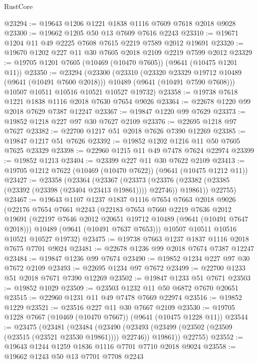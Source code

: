 \begin{lexlean}{RustCore}
\begin{coremodule}
@23294 := @19643 @1206 @1221 @1838 @1116 @7609 @7618 @2018 @9028
@23300 := @19662 @1205 @50 @13 @7609 @7616 @2243
@23310 := @19671 @1204 @11 @49 @2225 @7608 @7615 @2219 @7589 @2012 @19691
@23320 := @19670 @1202 @227 @11 @30 @7605 @2018 @2109 @2219 @7599 @2012
@23329 := @19705 @1201 @7605 (@10469 (@10470 @7605)) (@9641 (@10475 @1201 @11))
@23350 := @23294
    (@23300
      (@23310
        (@23320 @23329 @19712 @10489 (@9641 (@10491 @7600 @2018)))
        @10489
        (@9641 (@10491 @7590 @7608)))
      @10507
      @10511
      @10516
      @10521
      @10527
      @19732)
@23358 := @19738 @7618 @1221 @1838 @1116 @2018 @7630 @7654 @9026
@23364 := @22678 @1220 @99 @2018 @7629 @7387 @12247
@23367 := @19847 @1220 @99 @7629
@23373 := @19852 @1218 @227 @97 @30 @7627 @2109
@23376 := @22695 @1218 @97 @7627
@23382 := @22700 @1217 @51 @2018 @7626 @7390 @12269
@23385 := @19847 @1217 @51 @7626
@23392 := @19852 @1202 @1216 @11 @50 @7605 @7625 @23329
@23398 := @22960 @1215 @11 @49 @7478 @7624 @22974
@23399 := @19852 @1213
@23404 := @23399 @227 @11 @30 @7622 @2109
@23413 := @19705 @1212 @7622 (@10469 (@10470 @7622)) (@9641 (@10475 @1212 @11))
@23427 := @23358
    (@23364
      (@23367
        (@23373 (@23376 (@23382 (@23385 (@23392 (@23398 (@23404 @23413 @19861)))) @22746)) @19861))
      @22755)
@23467 := @19643
    @1107
    @1237
    @1837
    @1116
    @7654
    @7663
    @2018
    @9026
    (@22176
      @7654
      @7661
      @2243
      (@22183
        @7653
        @7660
        @2219
        @7636
        @2012
        @19691
        (@22197 @7646 @2012 @20651 @19712 @10489 (@9641 (@10491 @7647 @2018)))
        @10489
        (@9641 (@10491 @7637 @7653)))
      @10507
      @10511
      @10516
      @10521
      @10527
      @19732)
@23475 := @19738 @7663 @1237 @1837 @1116 @2018 @7675 @7701 @9024
@23481 := @22678 @1236 @99 @2018 @7674 @7387 @12247
@23484 := @19847 @1236 @99 @7674
@23490 := @19852 @1234 @227 @97 @30 @7672 @2109
@23493 := @22695 @1234 @97 @7672
@23499 := @22700 @1233 @51 @2018 @7671 @7390 @12269
@23502 := @19847 @1233 @51 @7671
@23503 := @19852 @1029
@23509 := @23503 @1232 @11 @50 @6872 @7670 @20651
@23515 := @22960 @1231 @11 @49 @7478 @7669 @22974
@23516 := @19852 @1229
@23521 := @23516 @227 @11 @30 @7667 @2109
@23530 := @19705 @1228 @7667 (@10469 (@10470 @7667)) (@9641 (@10475 @1228 @11))
@23544 := @23475
    (@23481
      (@23484
        (@23490 (@23493 (@23499 (@23502 (@23509 (@23515 (@23521 @23530 @19861)))) @22746)) @19861))
      @22755)
@23552 := @19643 @1244 @1259 @1836 @1116 @7701 @7710 @2018 @9024
@23558 := @19662 @1243 @50 @13 @7701 @7708 @2243

\end{coremodule}
\end{lexlean}
